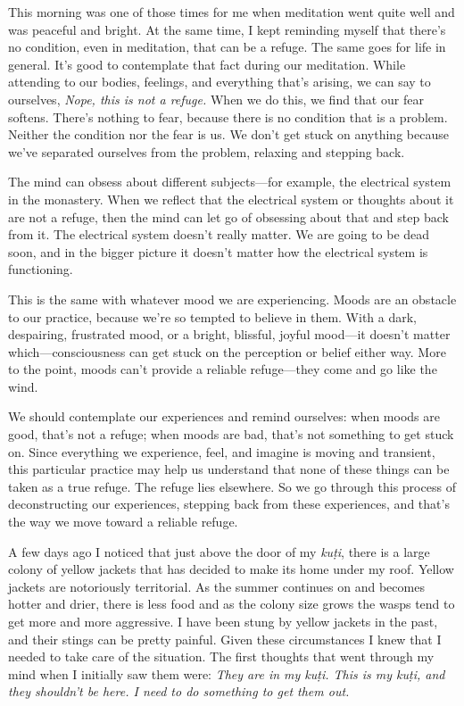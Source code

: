 
This morning was one of those times for me when meditation went quite 
well and was peaceful and bright. At the same time, I kept reminding 
myself that there's no condition, even in meditation, that can be a 
refuge. The same goes for life in general. It's good to contemplate 
that fact during our meditation. While attending to our bodies, 
feelings, and everything that's arising, we can say to ourselves, 
\emph{Nope, this is not a refuge.} When we do this, we find that our 
fear softens. There's nothing to fear, because there is no condition 
that is a problem. Neither the condition nor the fear is us. We don't 
get stuck on anything because we've separated ourselves from the 
problem, relaxing and stepping back.

The mind can obsess about different subjects---for example, the 
electrical system in the monastery. When we reflect that the electrical 
system or thoughts about it are not a refuge, then the mind can let go 
of obsessing about that and step back from it. The electrical system 
doesn't really matter. We are going to be dead soon, and in the bigger 
picture it doesn't matter how the electrical system is functioning.

This is the same with whatever mood we are experiencing. Moods are an 
obstacle to our practice, because we're so tempted to believe in them. 
With a dark, despairing, frustrated mood, or a bright, blissful, joyful 
mood---it doesn't matter which---consciousness can get stuck on the 
perception or belief either way. More to the point, moods can't provide 
a reliable refuge---they come and go like the wind.

We should contemplate our experiences and remind ourselves: when moods 
are good, that's not a refuge; when moods are bad, that's not something 
to get stuck on. Since everything we experience, feel, and imagine is 
moving and transient, this particular practice may help us understand 
that none of these things can be taken as a true refuge. The refuge 
lies elsewhere. So we go through this process of deconstructing our 
experiences, stepping back from these experiences, and that's the way 
we move toward a reliable refuge.


A few days ago I noticed that just above the door of my \emph{kuṭi}, 
there is a large colony of yellow jackets that has decided to make its 
home under my roof. Yellow jackets are notoriously territorial. As the 
summer continues on and becomes hotter and drier, there is less food 
and as the colony size grows the wasps tend to get more and more 
aggressive. I have been stung by yellow jackets in the past, and their 
stings can be pretty painful. Given these circumstances I knew that I 
needed to take care of the situation. The first thoughts that went 
through my mind when I initially saw them were: \emph{They are in my 
kuṭi. This is my kuṭi, and they shouldn't be here. I need to do 
something to get them out.}

